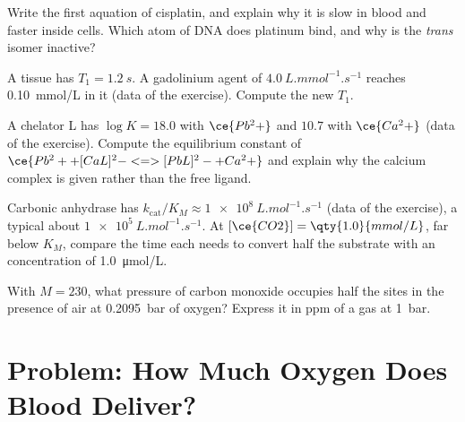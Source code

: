 \begin{exercise}[$\star\star$]\label{exo:b3:bioinorganic:8}
Write the first aquation of cisplatin, and explain why it is slow in blood and
faster inside cells. Which atom of DNA does platinum bind, and why is the
\textit{trans} isomer inactive?
\end{exercise}

\begin{exercise}[$\star\star$]\label{exo:b3:bioinorganic:9}
A tissue has $T_1 = \qty{1.2}{s}$. A gadolinium agent of  $\qty{4.0}{L.mmol^{-1}.s^{-1}}$ reaches \qty{0.10}{mmol/L}
in it (data of the exercise). Compute the new $T_1$.
\end{exercise}

\begin{exercise}[$\star\star\star$]\label{exo:b3:bioinorganic:10}
A chelator L has $\log K = 18.0$ with $\ce{Pb^2+}$ and $10.7$ with $\ce{Ca^2+}$ (data of the exercise).
Compute the equilibrium constant of $\ce{Pb^2+ + [CaL]^2- <=> [PbL]^2- + Ca^2+}$ and explain why the calcium
complex is given rather than the free ligand.
\end{exercise}

\begin{exercise}[$\star\star\star$]\label{exo:b3:bioinorganic:11}
Carbonic anhydrase has $k_{\mathrm{cat}}/K_M \approx \qty{1e8}{L.mol^{-1}.s^{-1}}$ (data of the exercise), a typical  about
$\qty{1e5}{L.mol^{-1}.s^{-1}}$. At $[\ce{CO2}] = \qty{1.0}{mmol/L}$, far below $K_M$, compare the time each needs to convert half
the substrate with an  concentration of \qty{1.0}{\micro mol/L}.
\end{exercise}

\begin{exercise}[$\star\star\star$]\label{exo:b3:bioinorganic:12}
With $M = 230$, what pressure of carbon monoxide occupies half the sites in the
presence of air at \qty{0.2095}{bar} of oxygen? Express it in ppm of a gas at \qty{1}{bar}.
\end{exercise}

\section{Problem: How Much Oxygen Does Blood Deliver?}


